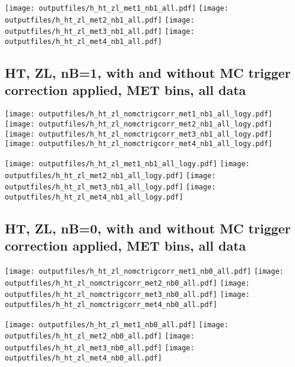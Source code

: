 \documentclass[11pt]{article}
\begin{document}
    \noindent
     \texttt{[image: outputfiles/h\_ht\_zl\_met1\_nb1\_all.pdf]}
     \texttt{[image: outputfiles/h\_ht\_zl\_met2\_nb1\_all.pdf]}
     \texttt{[image: outputfiles/h\_ht\_zl\_met3\_nb1\_all.pdf]}
     \texttt{[image: outputfiles/h\_ht\_zl\_met4\_nb1\_all.pdf]}

   \clearpage
     \subsection{ HT, ZL, nB=1, with and without MC trigger correction applied, MET bins, all data}

    \noindent
     \texttt{[image: outputfiles/h\_ht\_zl\_nomctrigcorr\_met1\_nb1\_all\_logy.pdf]}
     \texttt{[image: outputfiles/h\_ht\_zl\_nomctrigcorr\_met2\_nb1\_all\_logy.pdf]}
     \texttt{[image: outputfiles/h\_ht\_zl\_nomctrigcorr\_met3\_nb1\_all\_logy.pdf]}
     \texttt{[image: outputfiles/h\_ht\_zl\_nomctrigcorr\_met4\_nb1\_all\_logy.pdf]}

    \noindent
     \texttt{[image: outputfiles/h\_ht\_zl\_met1\_nb1\_all\_logy.pdf]}
     \texttt{[image: outputfiles/h\_ht\_zl\_met2\_nb1\_all\_logy.pdf]}
     \texttt{[image: outputfiles/h\_ht\_zl\_met3\_nb1\_all\_logy.pdf]}
     \texttt{[image: outputfiles/h\_ht\_zl\_met4\_nb1\_all\_logy.pdf]}

   \clearpage
     \subsection{ HT, ZL, nB=0, with and without MC trigger correction applied, MET bins, all data}

    \noindent
     \texttt{[image: outputfiles/h\_ht\_zl\_nomctrigcorr\_met1\_nb0\_all.pdf]}
     \texttt{[image: outputfiles/h\_ht\_zl\_nomctrigcorr\_met2\_nb0\_all.pdf]}
     \texttt{[image: outputfiles/h\_ht\_zl\_nomctrigcorr\_met3\_nb0\_all.pdf]}
     \texttt{[image: outputfiles/h\_ht\_zl\_nomctrigcorr\_met4\_nb0\_all.pdf]}

    \noindent
     \texttt{[image: outputfiles/h\_ht\_zl\_met1\_nb0\_all.pdf]}
     \texttt{[image: outputfiles/h\_ht\_zl\_met2\_nb0\_all.pdf]}
     \texttt{[image: outputfiles/h\_ht\_zl\_met3\_nb0\_all.pdf]}
     \texttt{[image: outputfiles/h\_ht\_zl\_met4\_nb0\_all.pdf]}
\end{document}
